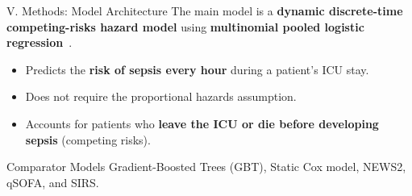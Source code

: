 \begin{frame}{V. Methods: Model Architecture}
The main model is a \textbf{dynamic discrete-time competing-risks hazard
model} using \textbf{multinomial pooled logistic
regression}~\cite{dagostino1990pooled}.

\vspace{6pt}
\begin{itemize}
  \item Predicts the \textbf{risk of sepsis every hour} during a patient's
        ICU stay.
  \item Does not require the proportional hazards assumption.
  \item Accounts for patients who \textbf{leave the ICU or die before
        developing sepsis} (competing risks).
\end{itemize}

\vspace{8pt}
\begin{exampleblock}{Comparator Models}
Gradient-Boosted Trees (GBT), Static Cox model, NEWS2, qSOFA, and SIRS.
\end{exampleblock}
\end{frame}



